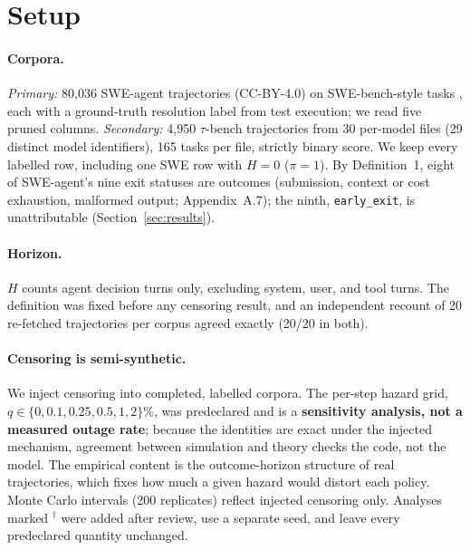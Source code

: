 \documentclass[letterpaper]{article} %
\newcommand{\rev}{$^{\dagger}$}
\begin{document}
\section{Setup}
\label{sec:setup}

\paragraph{Corpora.} \emph{Primary:} 80{,}036 SWE-agent
\citep{yang2024sweagent} trajectories \citep{nebius2024trajectories}
(CC-BY-4.0) on SWE-bench-style tasks
\citep{jimenez2024swebench,openai2024swebenchverified}, each with a
ground-truth resolution label from test execution; we read five pruned columns.
\emph{Secondary:} 4{,}950 $\tau$-bench trajectories
\citep{agentsuite2026taubench,yao2025taubench} from 30 per-model files (29
distinct model identifiers), 165 tasks per file, strictly binary score. We keep
every labelled row, including one SWE row with $H=0$ ($\pi=1$). By
Definition~1, eight of SWE-agent's nine exit statuses are outcomes (submission,
context or cost exhaustion, malformed output; Appendix~A.7); the ninth,
\texttt{early\_exit}, is unattributable (Section~\ref{sec:results}).

\paragraph{Horizon.} $H$ counts agent decision turns only, excluding system,
user, and tool turns. The definition was fixed before any censoring result, and
an independent recount of 20 re-fetched trajectories per corpus agreed exactly
(20/20 in both).

\paragraph{Censoring is semi-synthetic.} We inject censoring into completed,
labelled corpora. The per-step hazard grid, $q\in\{0, 0.1, 0.25, 0.5, 1,
2\}\%$, was predeclared and is a \textbf{sensitivity analysis, not a measured
outage rate};
because the identities are exact under the injected mechanism, agreement between
simulation and theory checks the code, not the model. The empirical content is
the outcome-horizon structure of real trajectories, which fixes how much a given
hazard would distort each policy. Monte Carlo intervals (200 replicates) reflect injected
censoring only. Analyses marked \rev{} were added after review, use a separate
seed, and leave every predeclared quantity unchanged.
\end{document}
